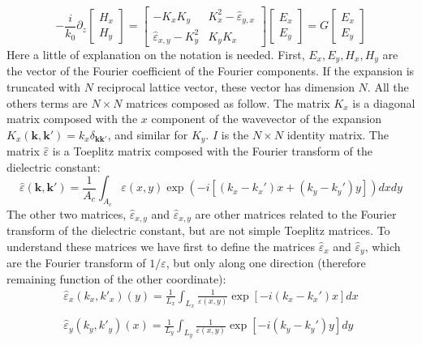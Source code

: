 \documentclass[a4paper,10pt]{report}
\begin{document}
\begin{equation} \label{eq:def_G}
-\frac{i}{k_0} \partial_z \left[ \begin{array}{c} H_x \\ H_y \end{array} \right] =
\left[ \begin{array}{cc} -K_xK_y & K_x^2 - \hat{\varepsilon}_{y,x} \\ \hat{\varepsilon}_{x,y} - K_y^2 & K_yK_x \end{array} \right]
\left[ \begin{array}{c} E_x \\ E_y \end{array} \right]= 
G \left[ \begin{array}{c} E_x \\ E_y \end{array} \right]
\end{equation}
Here a little of explanation on the notation is needed. First, $E_x,E_y,H_x,H_y$ are the vector of the Fourier coefficient of the Fourier components. If the expansion is truncated with $N$ reciprocal lattice vector, these vector has dimension $N$. All the others terms are $N \times N$ matrices composed as follow. The matrix $K_x$ is a diagonal matrix composed with the $x$ component of the wavevector of the expansion $K_x(\mathbf{k},\mathbf{k}') = k_x \delta_{\mathbf{k}\mathbf{k}'}$, and similar for $K_y$. $I$ is the $N \times N$ identity matrix.  The matrix $\hat{\varepsilon}$ is a Toeplitz matrix composed with the Fourier transform of the dielectric constant:
\begin{equation}
\hat{\varepsilon}(\mathbf{k},\mathbf{k}') = \frac{1}{A_c} \int_{A_c} \varepsilon(x,y)\exp(-i[(k_x-k_x')x+(k_y-k_y')y]) dxdy
\end{equation}
The other two matrices, $\hat{\varepsilon}_{x,y}$ and $\hat{\varepsilon}_{x,y}$ are other matrices related to the Fourier transform of the dielectric constant, but are not simple Toeplitz matrices. 
To understand these matrices we have first to define the matrices $\hat{\varepsilon}_{x}$ and $\hat{\varepsilon}_{y}$, which are the Fourier transform of $1/\varepsilon$, but only along one direction (therefore remaining function of the other coordinate):
\begin{equation}
\begin{array}{c}
\hat{\varepsilon}_x(k_x,k'_x)(y) = \frac{1}{L_x} \int_{L_x} \frac{1}{\varepsilon(x,y)} \exp[-i(k_x-k_x')x] dx \\
\quad \\
\hat{\varepsilon}_y(k_y,k'_y)(x) = \frac{1}{L_y} \int_{L_y} \frac{1}{\varepsilon(x,y)} \exp[-i(k_y-k_y')y] dy \\
\end{array}
\end{equation}
\end{document}
